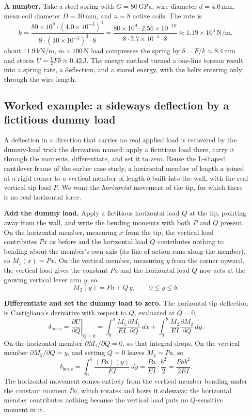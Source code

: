 \textbf{A number.} Take a steel spring with $G = 80\,\si{\giga\pascal}$,
wire diameter $d = 4.0\,\si{\milli\meter}$, mean coil diameter $D =
30\,\si{\milli\meter}$, and $n = 8$ active coils. The rate is
\[
k = \frac{80\times 10^{9}\cdot (4.0\times 10^{-3})^4}
         {8\cdot (30\times 10^{-3})^3\cdot 8}
= \frac{80\times 10^{9}\cdot 2.56\times 10^{-10}}
       {8\cdot 2.7\times 10^{-5}\cdot 8}
\approx 1.19\times 10^{4}\,\si{\newton\per\meter},
\]
about $11.9\,\si{\kilo\newton\per\meter}$, so a $100\,\si{\newton}$ load
compresses the spring by $\delta = F/k \approx 8.4\,\si{\milli\meter}$ and
stores $U = \tfrac12 F\delta \approx 0.42\,\si{\joule}$. The energy method
turned a one-line torsion result into a spring rate, a deflection, and a
stored energy, with the helix entering only through the wire length.

\subsection{Worked example: a sideways deflection by a fictitious dummy
load}

A deflection in a direction that carries no real applied load is recovered
by the dummy-load trick the derivation named: apply a fictitious load
there, carry it through the moments, differentiate, and set it to zero.
Reuse the L-shaped cantilever frame of the earlier case study, a horizontal
member of length $a$ joined at a rigid corner to a vertical member of length
$b$ built into the wall, with the real vertical tip load $P$. We want the
\emph{horizontal} movement of the tip, for which there is no real
horizontal force.

\textbf{Add the dummy load.} Apply a fictitious horizontal load $Q$ at the
tip, pointing away from the wall, and write the bending moments with both
$P$ and $Q$ present. On the horizontal member, measuring $x$ from the tip,
the vertical load contributes $Px$ as before and the horizontal load $Q$
contributes nothing to bending about the member's own axis (its line of
action runs along the member), so $M_1(x) = Px$. On the vertical member,
measuring $y$ from the corner upward, the vertical load gives the constant
$Pa$ and the horizontal load $Q$ now acts at the growing vertical lever arm
$y$, so
\[
M_2(y) = Pa + Q\,y,\qquad 0\le y\le b.
\]

\textbf{Differentiate and set the dummy load to zero.} The horizontal tip
deflection is Castigliano's derivative with respect to $Q$, evaluated at
$Q=0$,
\[
\delta_\text{horiz}
= \left.\frac{\partial U}{\partial Q}\right|_{Q=0}
= \int_0^a \frac{M_1}{EI}\frac{\partial M_1}{\partial Q}\,dx
+ \int_0^b \frac{M_2}{EI}\frac{\partial M_2}{\partial Q}\,dy.
\]
On the horizontal member $\partial M_1/\partial Q = 0$, so that integral
drops. On the vertical member $\partial M_2/\partial Q = y$, and setting
$Q=0$ leaves $M_2 = Pa$, so
\[
\delta_\text{horiz}
= \int_0^b \frac{(Pa)(y)}{EI}\,dy
= \frac{Pa}{EI}\cdot\frac{b^2}{2}
= \frac{P a b^2}{2EI}.
\]
The horizontal movement comes entirely from the vertical member bending
under the constant moment $Pa$, which rotates and bows it sideways; the
horizontal member contributes nothing because the vertical load puts no
$Q$-sensitive moment in it.

